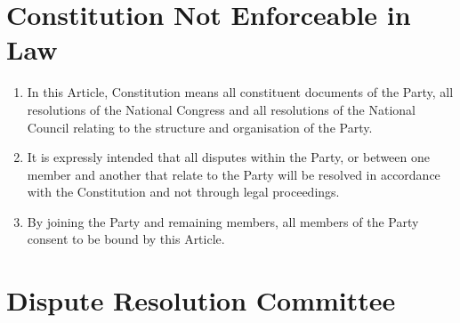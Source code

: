\documentclass[a4paper,titlepage,8.5pt]{article}
\begin{document}
\section{Constitution Not Enforceable in Law}

\begin{enumerate}
\item In this Article, Constitution means all constituent documents of the Party, all resolutions of the National Congress and all resolutions of the National Council relating to the structure and organisation of the Party.
\item It is expressly intended that all disputes within the Party, or between one member and another that relate to the Party will be resolved in accordance with the Constitution and not through legal proceedings.
\item By joining the Party and remaining members, all members of the Party consent to be bound by this Article.
\end{enumerate}

\section{Dispute Resolution Committee}
\end{document}
